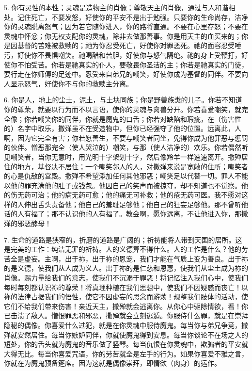 5. 你有灵性的本性；灵魂是造物主的肖像；尊敬天主的肖像，通过与人和谐相处。记住死亡，不要发怒，好使你的平安不是出于勉强。只要你的生命尚存，洁净你的灵魂脱离怒气；因为若它随你进入，你的路将直通。不要在心里存怒；不要在灵魂中怀忿；你无权支配你的灵魂，除非去做那善事。你是用天主的血买来的；你是因基督的苦难被救赎的；祂为你忍受死亡，好使你对罪恶死。祂的面容忍受唾污，好使你不畏惧嘲笑。祂喝醋和苦胆，好使你与怒气隔绝。祂的身上受鞭打，好使你不怕受苦。你若是祂真实的仆人，要敬畏你圣洁的主；你若是祂真实的门徒，要行走在你师傅的足迹中。忍受来自弟兄的嘲笑，好使你成为基督的同伴。不要向人显示怒气，好使你不与你的救赎主分离。\par

6. 你是人，地上的尘土，泥土，与土块同族；你是野兽族类的儿子。你若不知道你的尊荣，就要以行为而不以言语，使你的灵魂与禽兽分开。你若喜爱嘲笑，就完全像；你若嘲笑你的同伴，你就是魔鬼的口舌；你若对缺陷和瑕疵，在（伤害性的）名字中取乐，撒殚虽不在受造物中，但你已经强夺了他的位置。远离此，人啊，因为它完全有害；你若愿善生，不要与嘲笑者同坐，免得你成为他罪恶与惩罚的伙伴。憎恶那完全（使人哭泣的）嘲笑，与那（使人洁净的）欢乐。你若偶然听见嘲笑者，当你无意时，用光明十字架划十字，然后像羚羊一样速速离开。撒殚居住的地方，基督决不居住；一个嘲笑邻人的人，对撒殚来说是宽敞的住所；嘲笑者的心是仇敌的宫殿。撒殚不希望添加任何其他邪恶；嘲笑足以代替一切。罪人不能以他的罪充满他的肚子或钱包。他因自己的笑声而被掠夺，却不知道也不觉察。他的伤无药可治；他的病无药可愈；他的痛无可补救；他的疮无药可医。我不愿对这样的人伸出舌头责备他；他自己的羞耻足够他；他自己的狂妄足够他。那不曾听他话的人有福了；那不认识他的人有福了。教会啊，愿你远离，不让他进入你，那撒殚的邪恶酵母！\par

7. 生命的道路是狭窄的，折磨的道路是广阔的；祈祷能将人带到天国的居所。这是完美的工作：纯洁无罪的祈祷。人的义德算不得什么。人的工作是什么？他的劳苦全是虚妄。主啊，出于祢，出于祢的恩宠，我们才能在气质上变为善良。出于祢的是义德，使我们从人成为义人。出于祢的是仁慈和恩惠，使我们从尘土成为祢的肖像。赐力量给我们的意志，使我们不沉溺于罪恶！将记忆注入我们心中，使我们每时每刻都认识祢的尊荣！将真理种植在我们思想中，使我们不因疑惑而丧亡！以祢的法律占据我们的悟性，使它不因虚妄的思念而游荡！规整我们肢体的活动，使它们不给我们带来伤害！亲近天主，撒殚就会逃离你。从你心中驱除情欲，看！你已击溃了敌人。憎恨罪恶和邪恶，撒殚就会立刻逃遁。你服侍什么罪，就是在崇拜隐秘的偶像。你喜爱什么过犯，就是在你灵魂中服侍魔鬼。每当你与弟兄争竞，撒殚就安然居住。每当你嫉妒同伴，你就使魔鬼得到安息。每当你谈论不在场之人的短处，你的舌头就为魔鬼的音乐做了竖琴。每当仇恨在你灵魂中，欺骗者的平安就大得无比。每当你喜爱咒语，你的劳苦就全是左手的行为。如果你喜爱不雅之言，你就在为魔鬼预备筵席。因为这就是偶像崇拜，即情欲（肉身）的运作。\par


